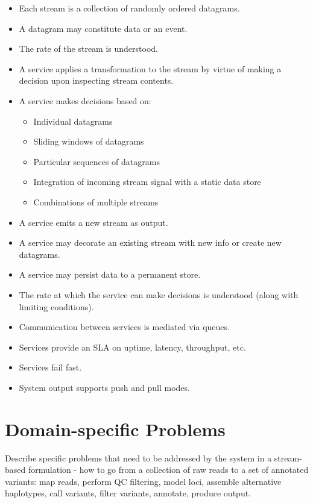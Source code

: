 \begin{itemize}
 \item Each stream is a collection of randomly ordered datagrams.
 \item A datagram may constitute data or an event.
 \item The rate of the stream is understood.
 \item A service applies a transformation to the stream by virtue of making a decision upon inspecting stream contents.
 \item A service makes decisions based on:
 \begin{itemize}
    \item Individual datagrams
    \item Sliding windows of datagrams
    \item Particular sequences of datagrams
    \item Integration of incoming stream signal with a static data store
    \item Combinations of multiple streams
 \end{itemize}
 \item A service emits a new stream as output.
 \item A service may decorate an existing stream with new info or create new datagrams.
 \item A service may persist data to a permanent store.
 \item The rate at which the service can make decisions is understood (along with limiting conditions).
 \item Communication between services is mediated via queues.
 \item Services provide an SLA on uptime, latency, throughput, etc.
 \item Services fail fast.
 \item System output supports push and pull modes.
\end{itemize}
\section{Domain-specific Problems}

Describe specific problems that need to be addressed by the system in a stream-based formulation - how to go from a collection of raw reads to a set of annotated variants: map reads, perform QC filtering, model loci, assemble alternative haplotypes, call variants, filter variants, annotate, produce output.  

